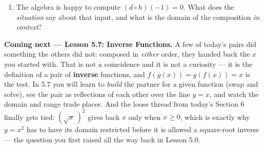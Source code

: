 \documentclass[10pt]{article}
\begin{document}
\begin{extensionbox}
\begin{enumerate}[label=(\alph*), leftmargin=1.8em, itemsep=5pt]
  \item The algebra is happy to compute $(d\circ h)(-1)=0$. What does the \emph{situation} say about
        that input, and what is the domain of the composition \emph{in context}?
\end{enumerate}
\end{extensionbox}

\begin{spiralbox}
\textbf{Coming next --- Lesson 5.7: Inverse Functions.} A few of today's pairs did something the
others did not: composed in \emph{either} order, they handed back the $x$ you started with. That is
not a coincidence and it is not a curiosity --- it is the definition of a pair of \textbf{inverse}
functions, and $f(g(x))=g(f(x))=x$ is the test. In 5.7 you will learn to \emph{build} the partner
for a given function (swap and solve), see the pair as reflections of each other over the line
$y=x$, and watch the domain and range trade places. And the loose thread from today's Section 6
finally gets tied: $\left(\sqrt{x}\,\right)^{2}$ gives back $x$ only when $x\ge0$, which is exactly
why $y=x^{2}$ has to have its domain restricted before it is allowed a square-root inverse --- the
question you first raised all the way back in Lesson 5.0.
\end{spiralbox}
\end{document}
